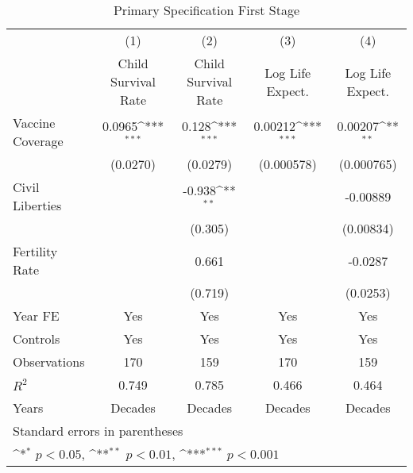 \begin{table}[htbp]\centering
\def\sym#1{\ifmmode^{#1}\else\(^{#1}\)\fi}
\caption{Primary Specification First Stage}
\begin{tabular}{l*{4}{c}}
\toprule
                &\multicolumn{1}{c}{(1)}&\multicolumn{1}{c}{(2)}&\multicolumn{1}{c}{(3)}&\multicolumn{1}{c}{(4)}\\
                &\multicolumn{1}{c}{Child Survival Rate}&\multicolumn{1}{c}{Child Survival Rate}&\multicolumn{1}{c}{Log Life Expect.}&\multicolumn{1}{c}{Log Life Expect.}\\
\midrule
Vaccine Coverage&   0.0965\sym{***}&    0.128\sym{***}&  0.00212\sym{***}&  0.00207\sym{**} \\
                & (0.0270)         & (0.0279)         &(0.000578)         &(0.000765)         \\
\addlinespace
Civil Liberties &                  &   -0.938\sym{**} &                  & -0.00889         \\
                &                  &  (0.305)         &                  &(0.00834)         \\
\addlinespace
Fertility Rate  &                  &    0.661         &                  &  -0.0287         \\
                &                  &  (0.719)         &                  & (0.0253)         \\
\addlinespace
Year FE         &      Yes         &      Yes         &      Yes         &      Yes         \\
\addlinespace
Controls        &      Yes         &      Yes         &      Yes         &      Yes         \\
\midrule
Observations    &      170         &      159         &      170         &      159         \\
\(R^{2}\)       &    0.749         &    0.785         &    0.466         &    0.464         \\
Years           &  Decades         &  Decades         &  Decades         &  Decades         \\
\bottomrule
\multicolumn{5}{l}{\footnotesize Standard errors in parentheses}\\
\multicolumn{5}{l}{\footnotesize \sym{*} \(p<0.05\), \sym{**} \(p<0.01\), \sym{***} \(p<0.001\)}\\
\end{tabular}
\end{table}
